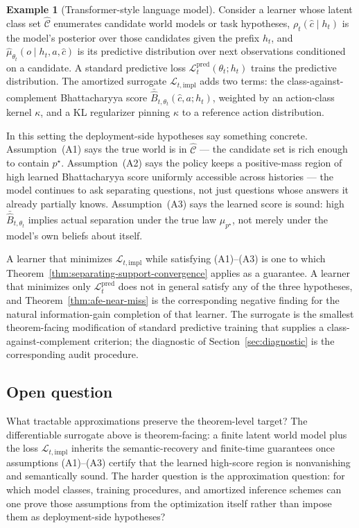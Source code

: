 \documentclass[11pt]{article}
\theoremstyle{definition}
\theoremstyle{remark}
\theoremstyle{plain}
\theoremstyle{definition}
\newtheorem{example}[theorem]{Example}
\newcommand{\Ccal}{\mathcal{C}}
\begin{document}
\begin{example}[Transformer-style language model]
\label{ex:transformer-surrogate}
Consider a learner whose latent class set $\widehat{\Ccal}$ enumerates candidate world models or task hypotheses, $\rho_t(\hat c\mid h_t)$ is the model's posterior over those candidates given the prefix $h_t$, and $\widehat\mu_{\theta_t}(o\mid h_t,a,\hat c)$ is its predictive distribution over next observations conditioned on a candidate. A standard predictive loss $\mathcal L_t^{\mathrm{pred}}(\theta_t;h_t)$ trains the predictive distribution. The amortized surrogate $\mathcal L_{t,\mathrm{impl}}$ adds two terms: the class-against-complement Bhattacharyya score $\bar{\widehat B}_{t,\theta_t}(\hat c,a;h_t)$, weighted by an action-class kernel $\kappa$, and a KL regularizer pinning $\kappa$ to a reference action distribution.

In this setting the deployment-side hypotheses say something concrete. Assumption~(A1) says the true world is in $\widehat{\Ccal}$ --- the candidate set is rich enough to contain $p^\star$. Assumption~(A2) says the policy keeps a positive-mass region of high learned Bhattacharyya score uniformly accessible across histories --- the model continues to ask separating questions, not just questions whose answers it already partially knows. Assumption~(A3) says the learned score is sound: high $\bar{\widehat B}_{t,\theta_t}$ implies actual separation under the true law $\mu_{p^\star}$, not merely under the model's own beliefs about itself.

A learner that minimizes $\mathcal L_{t,\mathrm{impl}}$ while satisfying (A1)--(A3) is one to which Theorem~\ref{thm:separating-support-convergence} applies as a guarantee. A learner that minimizes only $\mathcal L_t^{\mathrm{pred}}$ does not in general satisfy any of the three hypotheses, and Theorem~\ref{thm:afe-near-miss} is the corresponding negative finding for the natural information-gain completion of that learner. The surrogate is the smallest theorem-facing modification of standard predictive training that supplies a class-against-complement criterion; the diagnostic of Section~\ref{sec:diagnostic} is the corresponding audit procedure.
\end{example}

\subsection*{Open question}

What tractable approximations preserve the theorem-level target? The differentiable surrogate above is theorem-facing: a finite latent world model plus the loss $\mathcal L_{t,\mathrm{impl}}$ inherits the semantic-recovery and finite-time guarantees once assumptions \textup{(A1)--(A3)} certify that the learned high-score region is nonvanishing and semantically sound. The harder question is the approximation question: for which model classes, training procedures, and amortized inference schemes can one prove those assumptions from the optimization itself rather than impose them as deployment-side hypotheses?
\end{document}
